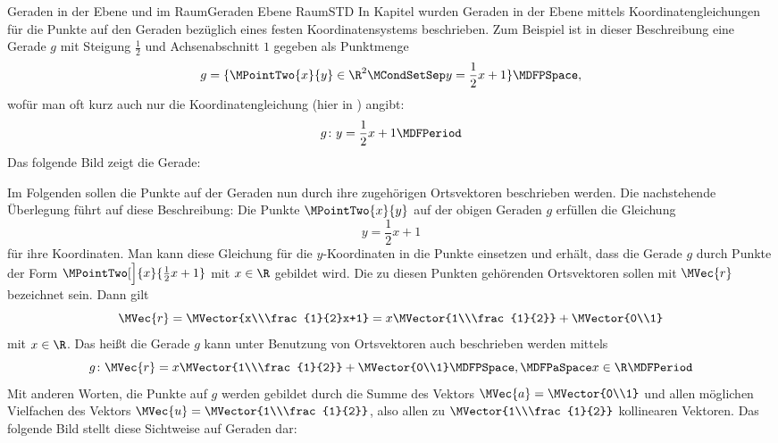 \begin{MXContent}{Geraden in der Ebene und im Raum}{Geraden Ebene Raum}{STD}
In Kapitel  wurden Geraden in der Ebene mittels Koordinatengleichungen für die Punkte auf den Geraden bezüglich eines festen Koordinatensystems beschrieben. Zum Beispiel ist in dieser Beschreibung eine Gerade $g$ mit Steigung $\frac{1}{2}$ und Achsenabschnitt $1$ gegeben als Punktmenge
\[
 g=\{\MPointTwo{x}{y}\in\R^2\MCondSetSep y=\frac{1}{2}x+1\} \MDFPSpace,
\]
wofür man oft kurz auch nur die Koordinatengleichung (hier in ) angibt:
\[
 g\colon y=\frac{1}{2}x+1\MDFPeriod
\]
Das folgende Bild zeigt die Gerade:
\begin{center}
\end{center}

Im Folgenden sollen die Punkte auf der Geraden nun durch ihre zugehörigen Ortsvektoren beschrieben werden. Die nachstehende Überlegung führt auf diese Beschreibung: Die Punkte $\MPointTwo{x}{y}$ auf der obigen Geraden $g$ erfüllen die Gleichung
\[
 y=\frac{1}{2}x+1
\]
für ihre Koordinaten. Man kann diese Gleichung für die $y$-Koordinaten in die Punkte einsetzen und erhält, dass die Gerade $g$ durch Punkte der Form $\MPointTwo[\Big]{x}{\frac{1}{2}x+1}$ mit $x\in\R$ gebildet wird. Die zu diesen Punkten gehörenden Ortsvektoren sollen mit $\MVec{r}$ bezeichnet sein. Dann gilt
\[
 \MVec{r}=\MVector{x\\\frac{1}{2}x+1}=x\MVector{1\\\frac{1}{2}}+\MVector{0\\1}
\]
mit $x\in\R$. Das heißt die Gerade $g$ kann unter Benutzung von Ortsvektoren auch beschrieben werden mittels
\[
 g\colon \MVec{r}=x\MVector{1\\\frac{1}{2}}+\MVector{0\\1} \MDFPSpace,\MDFPaSpace x\in\R \MDFPeriod
\]
Mit anderen Worten, die Punkte auf $g$ werden gebildet durch die Summe des Vektors $\MVec{a}=\MVector{0\\1}$ und allen möglichen Vielfachen des Vektors $\MVec{u}=\MVector{1\\\frac{1}{2}}$, also allen zu  $\MVector{1\\\frac{1}{2}}$ kollinearen Vektoren. Das folgende Bild stellt diese Sichtweise auf Geraden dar:


\end{MXContent}
